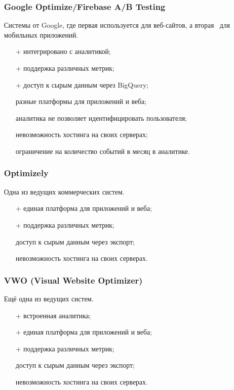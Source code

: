 \documentclass[../document.tex]{subfiles}
\begin{document}
    \subsubsection{Google Optimize/Firebase A/B Testing}
    \par Системы\cite{noauthor_optimize_nodate, noauthor_firebase_nodate} от Google, где первая используется для веб-сайтов, а вторая \textemdash\ для мобильных приложений.
    \begin{enumerate}
        \item[+] интегрировано с аналитикой;
        \item[+] поддержка различных метрик;
        \item[+] доступ к сырым данным через BigQuery;
        \item[\textminus] разные платформы для приложений и веба;
        \item[\textminus] аналитика не позволяет идентифицировать пользователя;
        \item[\textminus] невозможность хостинга на своих серверах;
        \item[\textminus] ограничение на количество событий в месяц в аналитике.      
    \end{enumerate}
    \subsubsection{Optimizely}
    \par Одна\cite{noauthor_optimizely_nodate} из ведущих коммерческих систем.
    \begin{enumerate}
        \item[+] единая платформа для приложений и веба;
        \item[+] поддержка различных метрик;
        \item[\textpm] доступ к сырым данным через экспорт;
        \item[\textminus] невозможность хостинга на своих серверах.
    \end{enumerate}
    \subsubsection{VWO (Visual Website Optimizer)}
    \par Ещё одна\cite{noauthor_vwo_nodate} из ведущих систем.
    \begin{enumerate}
        \item[+] встроенная аналитика;
        \item[+] единая платформа для приложений и веба;
        \item[+]  поддержка различных метрик;
        \item[\textpm]  доступ к сырым данным через экспорт;
        \item[\textminus] невозможность хостинга на своих серверах.
    \end{enumerate}
\end{document}
